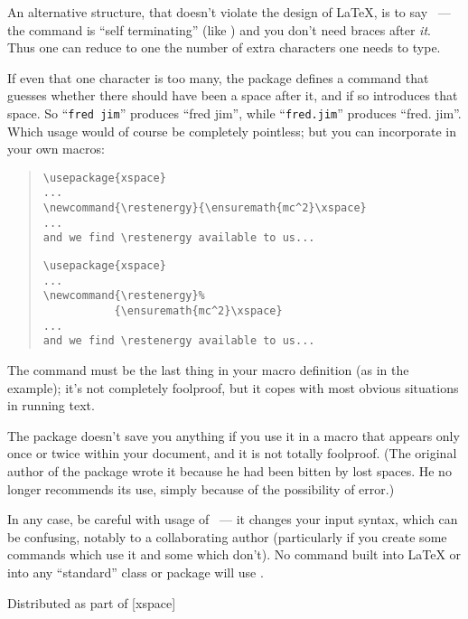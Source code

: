 An alternative structure, that doesn't violate the design of \LaTeX{},
is to say \csx{ }~--- the \csx{ } command is ``self
terminating'' (like \texttt{\bsbs }) and you don't need braces after
\emph{it}.  Thus one can reduce to one the number of extra characters
one needs to type.

If even that one character is too many, the package 
defines a command  that guesses whether there should have
been a space after it, and if so introduces that space.  So
``\texttt{fred jim}'' produces ``fred jim'', while
``\texttt{fred.\@ jim}'' produces ``fred. jim''.  Which
usage would of course be completely pointless; but you can incorporate
 in your own macros:
\begin{quote}
\begin{wideversion}
\begin{verbatim}
\usepackage{xspace}
...
\newcommand{\restenergy}{\ensuremath{mc^2}\xspace}
...
and we find \restenergy available to us...
\end{verbatim}
\end{wideversion}
\begin{narrowversion}
\begin{verbatim}
\usepackage{xspace}
...
\newcommand{\restenergy}%
           {\ensuremath{mc^2}\xspace}
...
and we find \restenergy available to us...
\end{verbatim}
\end{narrowversion}
\end{quote}
The  command must be the last thing in your macro
definition (as in the example); it's not completely foolproof, but it
copes with most obvious situations in running text.

The  package doesn't save you anything if you use it in
a macro that appears only once or twice within your document, and it
is not totally foolproof.  (The original author of the package wrote
it because he had been bitten by lost spaces.  He no longer recommends
its use, simply because of the possibility of error.)

In any case, be
careful with usage of ~--- it changes your input syntax,
which can be confusing, notably to a collaborating author
(particularly if you create some commands which use it and some which
don't).  No command built into \LaTeX{} or into any
``standard'' class or package will use .
\begin{ctanrefs}
\item[xspace.sty]Distributed as part of [xspace]
\end{ctanrefs}

